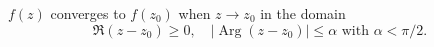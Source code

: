 $f(z)$ converges to $f(z_0)$ when $z \to z_0$ in the domain
$$\Re(z - z_0) \geq 0, \quad |\operatorname{Arg}(z - z_0)| \leq \alpha \text{ with } \alpha < \pi/2.$$
